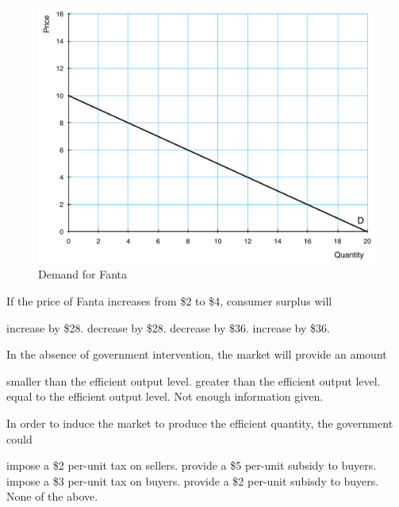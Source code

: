 \documentclass[addpoints,11pt]{exam}
\theoremstyle{definition}
\begin{document}
\begin{questions}
	\begin{figure}[H]
		\centering
		\includegraphics[scale=.40]{Exam1_MC22.pdf}
		\caption{Demand for Fanta}
		\label{MC23}
	\end{figure}
	
	If the price of Fanta increases from \$2 to \$4, consumer surplus will
	
	\begin{choices}
			\choice increase by \$28.
			\CorrectChoice decrease by \$28.
			\choice decrease by \$36.
			\choice increase by \$36.
	\end{choices}
	


\question \label{q8} In the absence of government intervention, the market will provide an amount

\begin{choices}
	\CorrectChoice smaller than the efficient output level.
	\choice greater than the efficient output level.
	\choice equal to the efficient output level.
	\choice Not enough information given.
\end{choices}


\question \label{q9} In order to induce the market to produce the efficient quantity, the government could 

\begin{choices}
	\choice impose a \$2 per-unit tax on sellers.
	\choice provide a \$5 per-unit subsidy to buyers. 
	\choice impose a \$3 per-unit tax on buyers.
	\CorrectChoice provide a \$2 per-unit subisdy to buyers.
	\choice None of the above.
\end{choices}


\end{questions}
\end{document}
